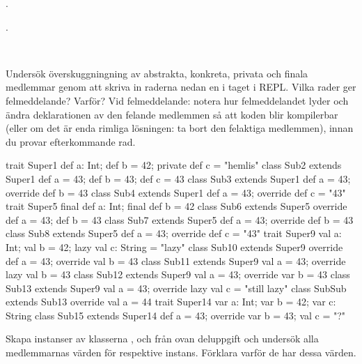 \SubtaskSolved  {}.

\SubtaskSolved  {}.


\QUESTEND







\QUESTBEGIN

\Task  \what~

\Subtask \label{subtask:overriderules} Undersök överskuggningning av abstrakta, konkreta, privata och finala medlemmar genom att skriva in raderna nedan en i taget i REPL. Vilka rader ger felmeddelande? Varför? Vid felmeddelande: notera hur felmeddelandet lyder och ändra deklarationen av den felande medlemmen så att koden blir kompilerbar (eller om det är enda rimliga lösningen: ta bort den felaktiga medlemmen), innan du provar efterkommande rad.

\begin{REPL}
trait Super1 { def a: Int; def b = 42; private def c = "hemlis" }
class Sub2 extends Super1 { def a = 43; def b = 43; def c = 43 }
class Sub3 extends Super1 { def a = 43; override def b = 43 }
class Sub4 extends Super1 { def a = 43; override def c = "43" }
trait Super5 { final def a: Int; final def b = 42 }
class Sub6 extends Super5 { override def a = 43; def b = 43 }
class Sub7 extends Super5 { def a = 43; override def b = 43 }
class Sub8 extends Super5 { def a = 43; override def c = "43" }
trait Super9 { val a: Int; val b = 42; lazy val c: String = "lazy" }
class Sub10 extends Super9 { override def a = 43; override val b = 43 }
class Sub11 extends Super9 { val a = 43; override lazy val b = 43 }
class Sub12 extends Super9 { val a = 43; override var b = 43 }
class Sub13 extends Super9 { val a = 43; override lazy val c = "still lazy" }
class SubSub extends Sub13 { override val a = 44}
trait Super14 { var a: Int; var b = 42; var c: String }
class Sub15 extends Super14 { def a = 43; override var b = 43; val c = "?" }
\end{REPL}

\Subtask Skapa instanser av klasserna ,  och  från ovan deluppgift och undersök alla medlemmarnas värden för respektive instans. Förklara varför de har dessa värden.


